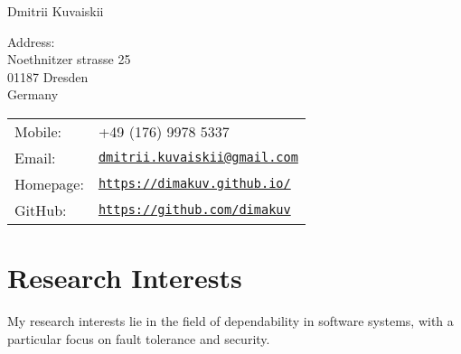 \documentclass[letterpaper]{article}
\def\name{Dmitrii Kuvaiskii}
\begin{document}
{\huge \name}


\vspace{0.25in}

\begin{minipage}{0.45\linewidth}
Address:\\
Noethnitzer strasse 25\\
01187 Dresden\\
Germany\\

 
\end{minipage}
\begin{minipage}{0.45\linewidth}
  \begin{tabular}{ll}
      Mobile: & +49 (176) 9978 5337\\
      Email: & \href{mailto:dmitrii.kuvaiskii@gmail.com}{\tt dmitrii.kuvaiskii@gmail.com} \\
    Homepage: & \href{https://dimakuv.github.io/}{\tt https://dimakuv.github.io/} \\
    GitHub: & \href{https://github.com/dimakuv}{\tt https://github.com/dimakuv} \\
  \end{tabular}
\end{minipage}


\section*{Research Interests}

My research interests lie in the field of dependability in software systems, with a particular focus on fault tolerance and security. %

\end{document}

